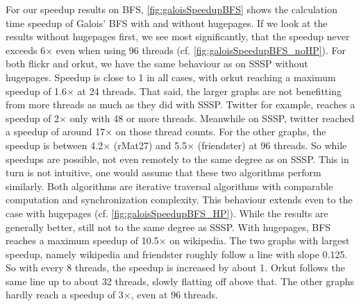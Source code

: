 For our speedup results on BFS, \autoref{fig:galoisSpeedupBFS} shows the calculation time speedup of Galois' BFS with and without hugepages.
If we look at the results without hugepages first, we see most significantly, that the speedup never exceeds 6$\times$ even when using 96 threads (cf. \autoref{fig:galoisSpeedupBFS_noHP}).
For both flickr and orkut, we have the same behaviour as on SSSP without hugepages. Speedup is close to 1 in all cases, with orkut reaching a maximum speedup of 1.6$\times$ at 24 threads.
That said, the larger graphs are not benefitting from more threads as much as they did with SSSP. Twitter for example, reaches a speedup of 2$\times$ only with 48 or more threads. Meanwhile on SSSP, twitter reached a speedup of around 17$\times$ on those thread counts.
For the other graphs, the speedup is between 4.2$\times$ (rMat27) and 5.5$\times$ (friendster) at 96 threads. So while speedups are possible, not even remotely to the same degree as on SSSP. This in turn is not intuitive, one would assume that these two algorithms perform similarly. Both algorithms are iterative traversal algorithms with comparable computation and synchronization complexity.
This behaviour extends even to the case with hugepages (cf. \autoref{fig:galoisSpeedupBFS_HP}). While the results are generally better, still not to the same degree as SSSP. With hugepages, BFS reaches a maximum speedup of 10.5$\times$ on wikipedia. The two graphs with largest speedup, namely wikipedia and friendster roughly follow a line with slope 0.125. So with every 8 threads, the speedup is increased by about 1. Orkut follows the same line up to about 32 threads, slowly flatting off above that.
The other graphs hardly reach a speedup of 3$\times$, even at 96 threads.


